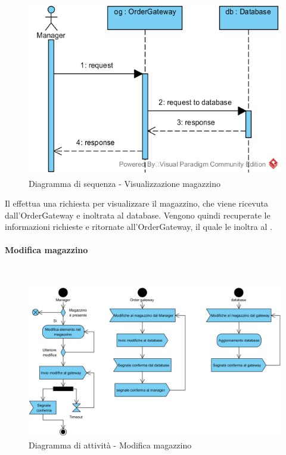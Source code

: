 \begin{figure}[H]
	\centering
	\includegraphics[width=14cm]{../../documenti/SpecificaTecnica/diagrammi_img/sequenza/direttore_visualizza_magazzino.png}
	\caption{Diagramma di sequenza - Visualizzazione magazzino}
\end{figure}
Il \Manager{} effettua una richiesta per visualizzare il magazzino, che viene ricevuta dall'Order\-Gateway e inoltrata al database. Vengono quindi recuperate le informazioni richieste e ritornate all'Order\-Gateway, il quale le inoltra al \Manager{}.

\paragraph{Modifica magazzino}\mbox{}\\
\nopagebreak
\begin{figure}[H]
	\centering
	\includegraphics[width=14cm]{diagrammi_img/attivita/manager_mag_modifiche.png}
	\caption{Diagramma di attività - Modifica magazzino}
\end{figure}

